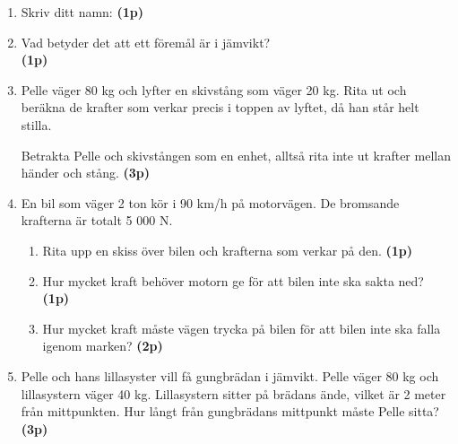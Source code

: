 \documentclass[11pt]{article}
\begin{document}
\begin{enumerate}[itemsep=1em]
        \item
              Skriv ditt namn: \underline{\hspace{5cm}} \textbf{(1p)}

        \item
              Vad betyder det att ett föremål är i jämvikt? \hrulefill{} \\
              \vspace{1em}
              \hrulefill{} \textbf{(1p)}

        \item
              \begin{minipage}[t]{0.6\textwidth}
                      Pelle väger 80 kg och lyfter en skivstång som väger 20 kg. Rita ut och beräkna de
                      krafter som verkar precis i toppen av lyftet, då han står helt stilla.

                      Betrakta Pelle och skivstången som en enhet, alltså rita inte ut krafter mellan händer och stång. \textbf{(3p)}
              \end{minipage}
              \hspace{2em}
              \begin{adjustbox}{valign=t}
                      
              \end{adjustbox}
        \item
              En bil som väger 2 ton kör i 90 km/h på motorvägen. De bromsande krafterna är totalt 5 000 N.
              \begin{enumerate}[label=\alph*)]
                      \item
                            Rita upp en skiss över bilen och krafterna som verkar på den. \textbf{(1p)}
                      \item
                            Hur mycket kraft behöver motorn ge för att bilen inte ska sakta ned? \textbf{(1p)}
                      \item
                            Hur mycket kraft måste vägen trycka på bilen för att bilen inte ska falla igenom marken? \textbf{(2p)}
              \end{enumerate}

        \item
              Pelle och hans lillasyster vill få gungbrädan i jämvikt. Pelle väger 80 kg och lillasystern väger 40 kg. Lillasystern sitter på brädans ände, vilket är 2 meter från mittpunkten. Hur långt från gungbrädans mittpunkt måste Pelle sitta? \textbf{(3p)}
              \begin{center}
                      
              \end{center}


\end{enumerate}
\end{document}
